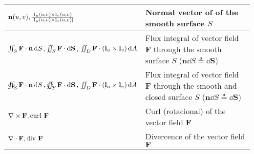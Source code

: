 \documentclass{article}
\begin{document}
\begin{xltabular}{\textwidth}{XX}
	\(\mathbf{n}(u,v), \frac{\mathbf{l}_u(u,v)\times\mathbf{l}_v(u,v)}{\abs{\mathbf{l}_u(u,v)\times\mathbf{l}_v(u,v)}}\)                                                                                                                       & Normal vector of of the smooth surface \(S\)                                                                                                                                                                                                                                                                                        \\ \hline
	\(\iint_S \mathbf{F}\cdot \mathbf{n} \dd{S}, \iint_S \mathbf{F} \cdot \dd{\mathbf{S}}, \newline \iint_D \mathbf{F} \cdot (\mathbf{l}_u\times\mathbf{l}_v) \dd{A}\)                                                                         & Flux integral of vector field \(\mathbf{F}\) through the smooth surface \(S\) (\(\mathbf{n} \dd{S} \triangleq \dd{\mathbf{S}}\))                                                                                                                                                                                                    \\ \hline
	\(\oiint_S \mathbf{F}\cdot \mathbf{n} \dd{S}, \oiint_S \mathbf{F} \cdot \dd{\mathbf{S}}, \newline \iint_D \mathbf{F} \cdot (\mathbf{l}_u\times\mathbf{l}_v) \dd{A}\)                                                                       & Flux integral of vector field \(\mathbf{F}\) through the smooth and closed surface \(S\) (\(\mathbf{n} \dd{S} \triangleq \dd{\mathbf{S}}\))                                                                                                                                                                                         \\ \hline
	\(\nabla \times \mathbf{F} , \textnormal{curl } \mathbf{F}\)                                                                                                                                                                               & Curl (rotacional) of the vector field \(\mathbf{F}\)                                                                                                                                                                                                                                                                                \\ \hline
	\(\nabla \cdot \mathbf{F} , \textnormal{div } \mathbf{F}\)                                                                                                                                                                                 & Divercence of the vector field \(\mathbf{F}\)                                                                                                                                                                                                                                                                                       \\ \hline

\end{xltabular}
\end{document}
